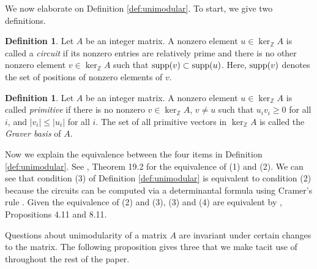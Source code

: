 \documentclass[letterpaper,12pt]{amsart}
\theoremstyle{plain}
\theoremstyle{definition}
\newtheorem{defn}[thm]{Definition}
\theoremstyle{remark}
\newcommand{\zz}{\mathbb{Z}}
\begin{document}
We now elaborate on Definition \ref{def:unimodular}.
To start, we give two definitions.
\begin{defn}\label{def:circuit}
	Let $A$ be an integer matrix.
	A nonzero element $u \in \ker_\zz A$
	is called a \emph{circuit} if its nonzero entries are relatively prime
	and there is no other nonzero element $v \in \ker_\zz A$ such that ${\rm supp}(v) \subset {\rm supp}(u)$.
 	Here, ${\rm supp}(v)$ denotes the set of  positions of nonzero elements of $v$.
\end{defn}

\begin{defn}\label{defn:graver}
	Let $A$ be an integer matrix.
	A nonzero element $u \in \ker_\zz A$ is called \emph{primitive} if there is no nonzero
	$v \in \ker_\zz A$, $v \neq u$ such that $u_i v_i \geq 0$ for all $i$, and $|v_i| \leq |u_i|$ for all $i$.
	The set of all primitive vectors in $\ker_\zz A$ is called the \emph{Graver basis} of $A$.
\end{defn}

\begin{comment}
The circuits of $A$ are always primitive, but the converse is not true in general.
If $A$ is unimodular, then the Graver basis equals the set of circuits (\cite{sturmfels}, Proposition 8.11)
but the converse is not true in general.
\end{comment}


Now we explain the equivalence between the four items in Definition \ref{def:unimodular}.
See \cite{Schrijver1986}, Theorem 19.2 for the equivalence of (1) and (2).
We can see that condition (3) of Definition \ref{def:unimodular} is equivalent to
condition (2) because the circuits can be computed via a determinantal formula
using Cramer's rule \cite[p.~35]{sturmfels}.
Given the equivalence of (2) and (3),
(3) and (4) are equivalent by \cite{sturmfels}, Propositions 4.11 and 8.11.
 
 
Questions about unimodularity of a matrix $A$ are invariant under certain changes to the matrix.
The following proposition gives three that we make tacit use of throughout the rest of the paper.
 
\end{document}
